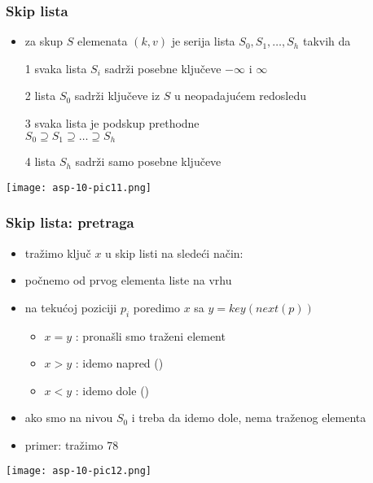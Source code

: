 \documentclass[compress]{beamer}
\begin{document}
\begin{frame}[fragile]
  \frametitle{Skip lista}
  \begin{itemize}
    \item {} za skup $S$ elemenata $(k, v)$ je serija lista $S_0, S_1, \ldots, S_h$ takvih da
    \item[1] svaka lista $S_i$ sadrži posebne ključeve $-\infty$ i $\infty$
    \item[2] lista $S_0$ sadrži ključeve iz $S$ u neopadajućem redosledu
    \item[3] svaka lista je podskup prethodne \\
    $S_0 \supseteq S_1 \supseteq \ldots \supseteq S_h$
    \item[4] lista $S_h$ sadrži samo posebne ključeve 
  \end{itemize}
  \begin{center}
    \texttt{[image: asp-10-pic11.png]}
  \end{center}
\end{frame}

\begin{frame}[fragile]
  \frametitle{Skip lista: pretraga}
  \begin{itemize}
    \item tražimo ključ $x$ u skip listi na sledeći način:
    \item počnemo od prvog elementa liste na vrhu
    \item na tekućoj poziciji $p_i$ poredimo $x$ sa $y = key(next(p))$
    \begin{itemize}
      \item $x = y$ : pronašli smo traženi element
      \item $x > y$ : idemo napred ()
      \item $x < y$ : idemo dole ()
    \end{itemize}
    \item ako smo na nivou $S_0$ i treba da idemo dole, nema traženog elementa
    \item primer: tražimo 78
  \end{itemize}
  \begin{center}
    \texttt{[image: asp-10-pic12.png]}
  \end{center}
\end{frame}
\end{document}
